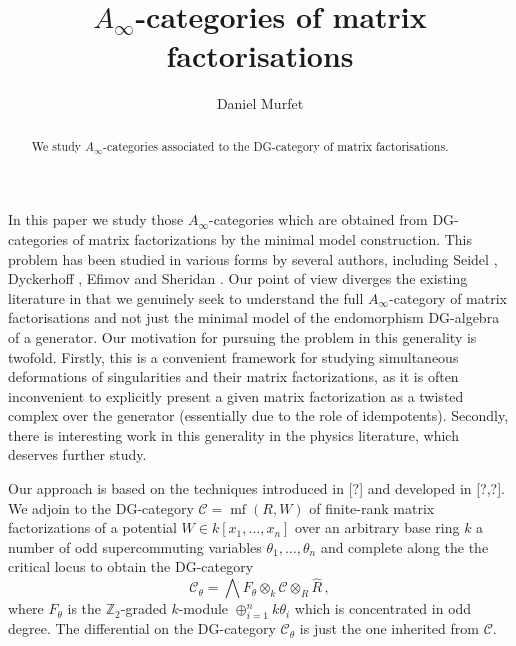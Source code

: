 \documentclass[english,letter paper,12pt,leqno]{article}
\theoremstyle{example}
\numberwithin{equation}{section}
\def\res{\operatorname{Res}}
\def\nZ{\mathds{Z}}
\DeclareMathOperator{\mf}{mf}
\begin{document}
\def\Res{\res\!}
\newcommand{\ud}{\mathrm{d}}
\newcommand{\Ress}[1]{\res_{#1}\!}
\newcommand{\cat}[1]{\mathcal{#1}}
\newcommand{\lto}{\longrightarrow}
\newcommand{\xlto}[1]{\stackrel{#1}\lto}
\newcommand{\md}[1]{\mathscr{#1}}
\def\sus{\l}
\def\l{\,|\,}
\def\sgn{\textup{sgn}}
\def\samp{\zeta}
\def\Samp{Z}
\def\traff{N}

\title{$A_\infty$-categories of matrix factorisations}
\author{Daniel Murfet}

\maketitle

\begin{abstract}
We study $A_\infty$-categories associated to the DG-category of matrix factorisations.
\end{abstract}


In this paper we study those $A_\infty$-categories which are obtained from DG-categories of matrix factorizations by the minimal model construction. This problem has been studied in various forms by several authors, including Seidel \cite{??}, Dyckerhoff \cite{??}, Efimov \cite{??} and Sheridan \cite{??}. Our point of view diverges the existing literature in that we genuinely seek to understand the full $A_\infty$-category of matrix factorisations and not just the minimal model of the endomorphism DG-algebra of a generator. Our motivation for pursuing the problem in this generality is twofold. Firstly, this is a convenient framework for studying simultaneous deformations of singularities and their matrix factorizations, as it is often inconvenient to explicitly present a given matrix factorization as a twisted complex over the generator (essentially due to the role of idempotents). Secondly, there is interesting work in this generality in the physics literature, which deserves further study.

Our approach is based on the techniques introduced in [?] and developed in [?,?]. We adjoin to the DG-category $\md{C} = \mf(R,W)$ of finite-rank matrix factorizations of a potential $W \in k[x_1,\ldots,x_n]$ over an arbitrary base ring $k$ a number of odd supercommuting variables $\theta_1,\ldots,\theta_n$ and complete along the the critical locus to obtain the DG-category
\[
\md{C}_\theta = \bigwedge F_\theta \otimes_k \md{C} \otimes_R \widehat{R}\,,
\]
where $F_\theta$ is the $\nZ_2$-graded $k$-module $\oplus_{i=1}^n k \theta_i$ which is concentrated in odd degree. The differential on the DG-category $\md{C}_\theta$ is just the one inherited from $\mathscr{C}$.
\end{document}

